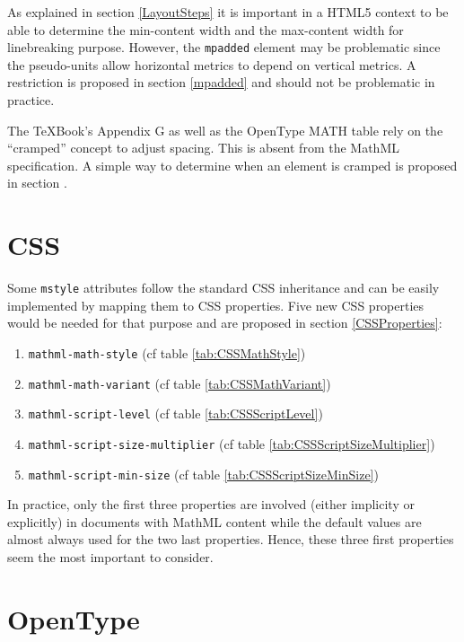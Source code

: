 As explained in section \ref{LayoutSteps} it is important in a
HTML5 context to be able to determine the min-content width and the max-content
width for linebreaking purpose. However, the {\tt mpadded} element may be
problematic since the pseudo-units allow horizontal metrics to depend on
vertical metrics. A restriction is proposed in section \ref{mpadded} and should
not be problematic in practice.

The \TeX Book's Appendix G as well as the OpenType MATH table rely on the
``cramped'' concept to adjust spacing. This is absent from the MathML
specification. A simple way to determine when an element is cramped is
proposed in section \label{LaTeX}.

\section{CSS}

Some {\tt mstyle} attributes follow the standard CSS inheritance and can be
easily implemented by mapping them to CSS properties. Five new CSS properties
would be needed for that purpose and are proposed in section
\ref{CSSProperties}:

\begin{enumerate}
\item {\tt mathml-math-style} (cf table \ref{tab:CSSMathStyle})
\item {\tt mathml-math-variant} (cf table \ref{tab:CSSMathVariant})
\item {\tt mathml-script-level} (cf table \ref{tab:CSSScriptLevel})
\item {\tt mathml-script-size-multiplier} (cf table \ref{tab:CSSScriptSizeMultiplier})
\item {\tt mathml-script-min-size} (cf table \ref{tab:CSSScriptSizeMinSize})
\end{enumerate}

In practice, only the first three properties are involved (either implicity
or explicitly) in documents with MathML content while the default values are
almost always used for the two last properties. Hence, these three first
properties seem the most important to consider.

\section{OpenType}

